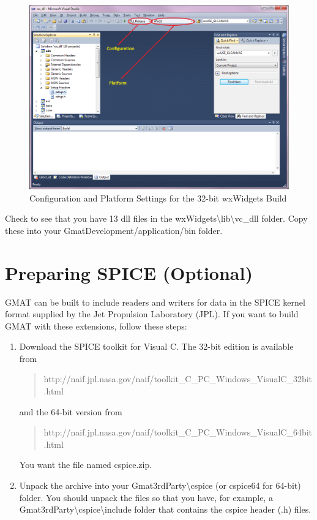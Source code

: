 \documentclass[letterpaper,10pt]{article}%
\begin{document}
\begin{figure}
\centering
\includegraphics[scale=0.6]{DLLRelease.eps}
\caption{Configuration and Platform Settings for the 32-bit wxWidgets Build}
\label{fig:wxSettings}
\end{figure}

\noindent Check to see that you have 13 dll files in the wxWidgets\textbackslash lib\textbackslash vc\_dll folder.  Copy these into your GmatDevelopment/application/bin folder.

\section{Preparing SPICE (Optional)}

GMAT can be built to include readers and writers for data in the SPICE kernel format supplied by the Jet Propulsion Laboratory (JPL).  If you want to build GMAT with these extensions, follow these steps:

\begin{enumerate}
\item Download the SPICE toolkit for Visual C.  The 32-bit edition is available from
\begin{quote}
http://naif.jpl.nasa.gov/naif/toolkit\_C\_PC\_Windows\_VisualC\_32bit.html
\end{quote}
\noindent and the 64-bit version from
\begin{quote}
http://naif.jpl.nasa.gov/naif/toolkit\_C\_PC\_Windows\_VisualC\_64bit.html
\end{quote}
\noindent You want the file named cspice.zip.
\item Unpack the archive into your Gmat3rdParty\textbackslash cspice (or cspice64 for 64-bit) folder.  You should unpack the files so that you have, for example, a Gmat3rdParty\textbackslash cspice\textbackslash include folder that contains the cspice header (.h) files.  
\end{enumerate}
\end{document}
